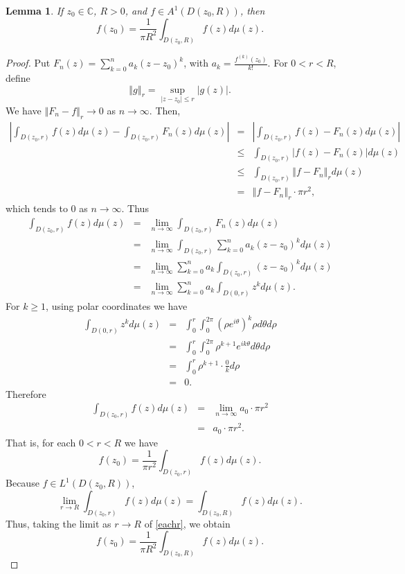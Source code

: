 \documentclass{article}
\newcommand{\norm}[1]{\left\Vert #1 \right\Vert}
\newtheorem{lemma}[theorem]{Lemma}
\begin{document}
\begin{lemma}
If $z_0 \in \mathbb{C}$, $R>0$, and $f \in A^1(D(z_0,R))$, then
\[
f(z_0)=\frac{1}{\pi R^2} \int_{D(z_0,R)} f(z) d\mu(z).
\]
\label{meanvalue}
\end{lemma}
\begin{proof}
Put $F_n(z)=\sum_{k=0}^n a_k (z-z_0)^k$, with $a_k=\frac{f^{(k)}(z_0)}{k!}$. For $0<r<R$,
define
\[
\norm{g}_r=\sup_{|z-z_0| \leq r} |g(z)|.
\]
We have $\norm{F_n - f}_r \to 0$ as $n \to \infty$. Then,
\begin{eqnarray*}
\left| \int_{D(z_0,r)} f(z) d\mu(z) - \int_{D(z_0,r)} F_n(z) d\mu(z) \right|&=&
\left| \int_{D(z_0,r)} f(z)-F_n(z) d\mu(z) \right|\\
&\leq&\int_{D(z_0,r)} |f(z)-F_n(z)| d\mu(z)\\
&\leq&\int_{D(z_0,r)} \norm{f-F_n}_r d\mu(z)\\
&=&\norm{f-F_n}_r \cdot \pi r^2,
\end{eqnarray*}
which tends to $0$ as $n \to \infty$. Thus
\begin{eqnarray*}
\int_{D(z_0,r)} f(z) d\mu(z)&=&\lim_{n \to \infty} \int_{D(z_0,r)} F_n(z) d\mu(z)\\
&=&\lim_{n \to \infty}  \int_{D(z_0,r)} \sum_{k=0}^n a_k  (z-z_0)^k d\mu(z)\\
&=&\lim_{n \to \infty} \sum_{k=0}^n a_k \int_{D(z_0,r)} (z-z_0)^k d\mu(z)\\
&=&\lim_{n \to \infty} \sum_{k=0}^n a_k \int_{D(0,r)} z^k d\mu(z).
\end{eqnarray*}
For $k \geq 1$, using polar coordinates we have
\begin{eqnarray*}
\int_{D(0,r)} z^k d\mu(z)&=&\int_0^r \int_0^{2\pi} (\rho e^{i\theta})^k \rho d\theta d\rho\\
&=&\int_0^r \int_0^{2\pi} \rho^{k+1} e^{ik\theta} d\theta d\rho\\
&=&\int_0^r \rho^{k+1} \cdot \frac{0}{k} d\rho\\
&=&0.
\end{eqnarray*}
Therefore
\begin{eqnarray*}
\int_{D(z_0,r)} f(z) d\mu(z)&=& \lim_{n \to \infty} a_0 \cdot \pi r^2\\
&=&a_0\cdot \pi r^2.
\end{eqnarray*}
That is, for each $0<r<R$ we have
\begin{equation}
f(z_0)=\frac{1}{\pi r^2} \int_{D(z_0,r)} f(z) d\mu(z).
\label{eachr}
\end{equation}
Because $f \in L^1(D(z_0,R))$, 
\[
\lim_{r \to R} \int_{D(z_0,r)} f(z) d\mu(z) = \int_{D(z_0,R)} f(z) d\mu(z).
\]
Thus, taking the limit as $r \to R$ of \eqref{eachr}, we obtain
\[
f(z_0)=\frac{1}{\pi R^2} \int_{D(z_0,R)} f(z) d\mu(z).
\]
\end{proof}
\end{document}

